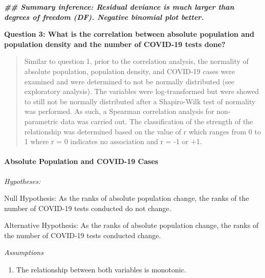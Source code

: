 \documentclass[
  12pt,
]{article}
\newenvironment{Shaded}{\begin{snugshade}}{\end{snugshade}}
\newcommand{\AttributeTok}[1]{\textcolor[rgb]{0.77,0.63,0.00}{#1}}
\newcommand{\CommentTok}[1]{\textcolor[rgb]{0.56,0.35,0.01}{\textit{#1}}}
\newcommand{\DocumentationTok}[1]{\textcolor[rgb]{0.56,0.35,0.01}{\textbf{\textit{#1}}}}
\newcommand{\FunctionTok}[1]{\textcolor[rgb]{0.00,0.00,0.00}{#1}}
\newcommand{\NormalTok}[1]{#1}
\newcommand{\OtherTok}[1]{\textcolor[rgb]{0.56,0.35,0.01}{#1}}
\newcommand{\SpecialCharTok}[1]{\textcolor[rgb]{0.00,0.00,0.00}{#1}}
\newcommand{\StringTok}[1]{\textcolor[rgb]{0.31,0.60,0.02}{#1}}
\providecommand{\tightlist}{%
  \setlength{\itemsep}{0pt}\setlength{\parskip}{0pt}}
\begin{document}
\begin{Shaded}
\begin{Highlighting}[]
\DocumentationTok{\#\# Summary inference: Residual deviance is much larger than degrees of freedom (DF). Negative binomial plot better.}
\end{Highlighting}
\end{Shaded}

\textbf{Question 3: What is the correlation between absolute population
and population density and the number of COVID-19 tests done?}

\begin{quote}
Similar to question 1, prior to the correlation analysis, the normality
of absolute population, population density, and COVID-19 cases were
examined and were determined to not be normally distributed (see
exploratory analysis). The variables were log-transformed but were
showed to still not be normally distributed after a Shapiro-Wilk test of
normality was performed. As such, a Spearman correlation analysis for
non-parametric data was carried out. The classification of the strength
of the relationship was determined based on the value of r which ranges
from 0 to 1 where r = 0 indicates no association and r = -1 or +1.
\end{quote}

\hypertarget{absolute-population-and-covid-19-cases-1}{%
\paragraph{Absolute Population and COVID-19
Cases}\label{absolute-population-and-covid-19-cases-1}}

\emph{Hypotheses:}

Null Hypothesis: As the ranks of absolute population change, the ranks
of the number of COVID-19 tests conducted do not change.

Alternative Hypothesis: As the ranks of absolute population change, the
ranks of the number of COVID-19 tests conducted change.

\emph{Assumptions}

\begin{enumerate}
\def\labelenumi{\arabic{enumi}.}
\tightlist
\item
  The relationship between both variables is monotonic.
\end{enumerate}

\begin{Shaded}
\end{Shaded}
\end{document}
